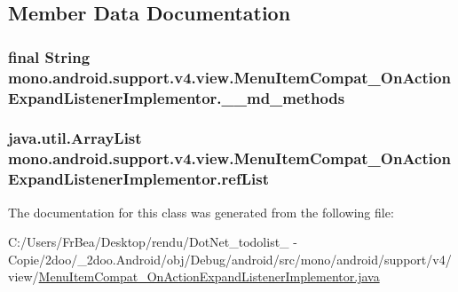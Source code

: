 \subsection{Member Data Documentation}
\hypertarget{classmono_1_1android_1_1support_1_1v4_1_1view_1_1_menu_item_compat___on_action_expand_listener_implementor_784a531fa2fd045297a4b6c40ff359a1}{
\subsubsection[{\_\-\_\-md\_\-methods}]{\setlength{\rightskip}{0pt plus 5cm}final String {\bf mono.android.support.v4.view.MenuItemCompat\_\-OnActionExpandListenerImplementor.\_\-\_\-md\_\-methods}}}
\label{classmono_1_1android_1_1support_1_1v4_1_1view_1_1_menu_item_compat___on_action_expand_listener_implementor_784a531fa2fd045297a4b6c40ff359a1}


\hypertarget{classmono_1_1android_1_1support_1_1v4_1_1view_1_1_menu_item_compat___on_action_expand_listener_implementor_233b3f8875fa2f9d475ae06730e8a32a}{
\subsubsection[{refList}]{\setlength{\rightskip}{0pt plus 5cm}java.util.ArrayList {\bf mono.android.support.v4.view.MenuItemCompat\_\-OnActionExpandListenerImplementor.refList}}}
\label{classmono_1_1android_1_1support_1_1v4_1_1view_1_1_menu_item_compat___on_action_expand_listener_implementor_233b3f8875fa2f9d475ae06730e8a32a}




The documentation for this class was generated from the following file:\begin{CompactItemize}
\item 
C:/Users/FrBea/Desktop/rendu/DotNet\_\-todolist\_ - Copie/2doo/\_\-2doo.Android/obj/Debug/android/src/mono/android/support/v4/view/\hyperlink{_menu_item_compat___on_action_expand_listener_implementor_8java}{MenuItemCompat\_\-OnActionExpandListenerImplementor.java}\end{CompactItemize}
